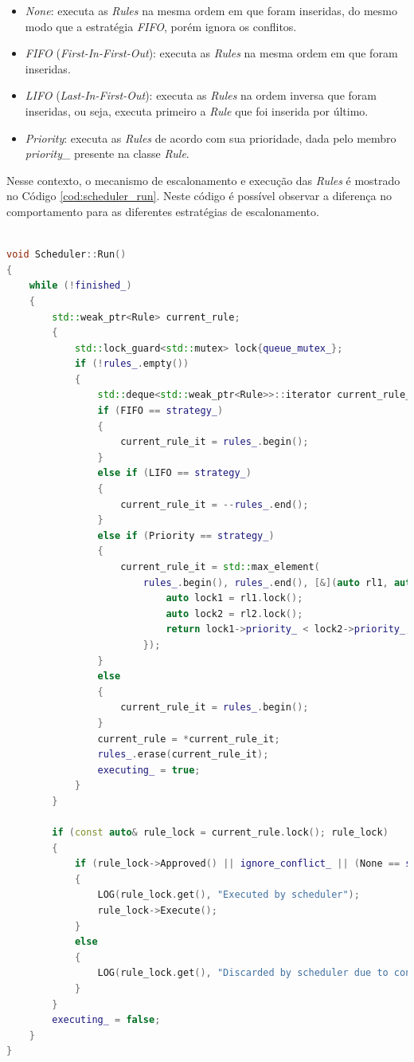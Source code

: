 \begin{itemize}
    \item \textit{None}: executa as \textit{Rules} na mesma ordem em que foram
          inseridas, do mesmo modo que a estratégia \textit{FIFO}, porém ignora
          os conflitos.
    \item \textit{FIFO} (\textit{First-In-First-Out}): executa as \textit{Rules}
          na mesma ordem em que foram inseridas.
    \item \textit{LIFO} (\textit{Last-In-First-Out}): executa as \textit{Rules}
          na ordem inversa que foram inseridas, ou seja, executa primeiro a
          \textit{Rule} que foi inserida por último.
    \item \textit{Priority}: executa as \textit{Rules} de acordo com sua
          prioridade, dada pelo membro \textit{priority\_} presente na classe
          \textit{Rule}.
\end{itemize}

Nesse contexto, o mecanismo de escalonamento e execução das \textit{Rules} é
mostrado no Código \ref{cod:scheduler_run}. Neste código é possível observar a
diferença no comportamento para as diferentes estratégias de escalonamento.

\begin{lstlisting}[language=C++,
caption = {Método \textit{Run} do \textit{Scheduler}
no \textit{Framework} PON C++ 4.0},
source = {Autoria própria}, label = {cod:scheduler_run}]

void Scheduler::Run()
{
    while (!finished_)
    {
        std::weak_ptr<Rule> current_rule;
        {
            std::lock_guard<std::mutex> lock{queue_mutex_};
            if (!rules_.empty())
            {
                std::deque<std::weak_ptr<Rule>>::iterator current_rule_it;
                if (FIFO == strategy_)
                {
                    current_rule_it = rules_.begin();
                }
                else if (LIFO == strategy_)
                {
                    current_rule_it = --rules_.end();
                }
                else if (Priority == strategy_)
                {
                    current_rule_it = std::max_element(
                        rules_.begin(), rules_.end(), [&](auto rl1, auto rl2) {
                            auto lock1 = rl1.lock();
                            auto lock2 = rl2.lock();
                            return lock1->priority_ < lock2->priority_;
                        });
                }
                else
                {
                    current_rule_it = rules_.begin();
                }
                current_rule = *current_rule_it;
                rules_.erase(current_rule_it);
                executing_ = true;
            }
        }

        if (const auto& rule_lock = current_rule.lock(); rule_lock)
        {
            if (rule_lock->Approved() || ignore_conflict_ || (None == strategy_))
            {
                LOG(rule_lock.get(), "Executed by scheduler");
                rule_lock->Execute();
            }
            else
            {
                LOG(rule_lock.get(), "Discarded by scheduler due to conflict");
            }
        }
        executing_ = false;
    }
}
\end{lstlisting}

